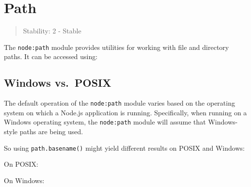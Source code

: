 \section{Path}\label{path}

\begin{quote}
Stability: 2 - Stable
\end{quote}

The \texttt{node:path} module provides utilities for working with file
and directory paths. It can be accessed using:

\begin{Shaded}
\begin{Highlighting}[]
\OperatorTok{=} \NormalTok{(}\NormalTok{)}\OperatorTok{;}
\end{Highlighting}
\end{Shaded}

\subsection{Windows vs.~POSIX}\label{windows-vs.-posix}

The default operation of the \texttt{node:path} module varies based on
the operating system on which a Node.js application is running.
Specifically, when running on a Windows operating system, the
\texttt{node:path} module will assume that Windows-style paths are being
used.

So using \texttt{path.basename()} might yield different results on POSIX
and Windows:

On POSIX:

\begin{Shaded}
\begin{Highlighting}[]
\NormalTok{(}\SpecialCharTok{\textbackslash{}\textbackslash{}}\SpecialCharTok{\textbackslash{}\textbackslash{}}\NormalTok{)}\OperatorTok{;}
\end{Highlighting}
\end{Shaded}

On Windows:

\begin{Shaded}
\begin{Highlighting}[]
\NormalTok{(}\SpecialCharTok{\textbackslash{}\textbackslash{}}\SpecialCharTok{\textbackslash{}\textbackslash{}}\NormalTok{)}\OperatorTok{;}
\end{Highlighting}
\end{Shaded}

